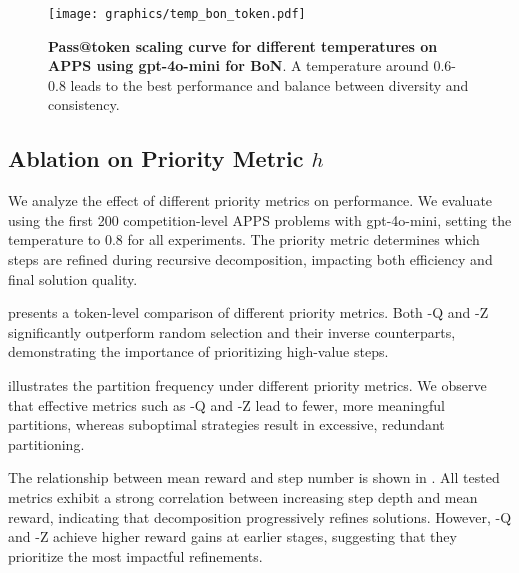 \begin{figure}[ht]
    \centering
    \texttt{[image: graphics/temp\_bon\_token.pdf]}
    \caption{\textbf{Pass@token scaling curve for different temperatures on APPS using gpt-4o-mini for BoN}. A temperature around 0.6-0.8 leads to the best performance and balance between diversity and consistency.}
    \label{fig:temp_bon_token}
\end{figure}


\newpage

\subsection{Ablation on Priority Metric $h$}
\label{sec:ab_prioritymetric}

We analyze the effect of different priority metrics on \decomp performance. We evaluate \decomp using the first 200 competition-level APPS problems with gpt-4o-mini, setting the temperature to 0.8 for all experiments. The priority metric determines which steps are refined during recursive decomposition, impacting both efficiency and final solution quality.

 presents a token-level comparison of different priority metrics. Both \decomp-Q and \decomp-Z significantly outperform random selection and their inverse counterparts, demonstrating the importance of prioritizing high-value steps.

 illustrates the partition frequency under different priority metrics. We observe that effective metrics such as \decomp-Q and \decomp-Z lead to fewer, more meaningful partitions, whereas suboptimal strategies result in excessive, redundant partitioning.

The relationship between mean reward and step number is shown in . All tested metrics exhibit a strong correlation between increasing step depth and mean reward, indicating that decomposition progressively refines solutions. However, \decomp-Q and \decomp-Z achieve higher reward gains at earlier stages, suggesting that they prioritize the most impactful refinements.

